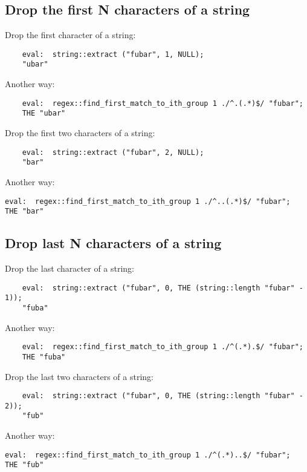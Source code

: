 \cutend*

\subsection{Drop the first N characters of a string}

Drop the first character of a string:
\begin{verbatim}
    eval:  string::extract ("fubar", 1, NULL);
    "ubar"
\end{verbatim}

Another way:
\begin{verbatim}
    eval:  regex::find_first_match_to_ith_group 1 ./^.(.*)$/ "fubar";
    THE "ubar"
\end{verbatim}

Drop the first two characters of a string:
\begin{verbatim}
    eval:  string::extract ("fubar", 2, NULL);
    "bar"
\end{verbatim}

Another way:
\begin{verbatim}
eval:  regex::find_first_match_to_ith_group 1 ./^..(.*)$/ "fubar";
THE "bar"
\end{verbatim}
\cutend*

\subsection{Drop last N characters of a string}

Drop the last character of a string:
\begin{verbatim}
    eval:  string::extract ("fubar", 0, THE (string::length "fubar" - 1));
    "fuba"
\end{verbatim}

Another way:
\begin{verbatim}
    eval:  regex::find_first_match_to_ith_group 1 ./^(.*).$/ "fubar";
    THE "fuba"
\end{verbatim}

Drop the last two characters of a string:
\begin{verbatim}
    eval:  string::extract ("fubar", 0, THE (string::length "fubar" - 2));
    "fub"
\end{verbatim}

Another way:
\begin{verbatim}
eval:  regex::find_first_match_to_ith_group 1 ./^(.*)..$/ "fubar";
THE "fub"
\end{verbatim}

